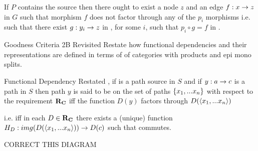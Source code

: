 \documentclass[xcolor=pst,dvips]{beamer}
\begin{document}
\begin{frame}
\IfSforproductepimonoCwithRCwords

 If $P$ contains the source  
then there ought to exist a node $z$ and an edge $f: x \rightarrow z$ in $G$ such that morphism $f$ does not factor through any of the $p_i$ morphisms 
i.e. such that there exist $g: y_i \rightarrow z$ in \catcw, for some $i$, such that $p_i\circ g = f$ in \catc. 
\end{frame}

\begin{frame}{Goodness Criteria 2B Revisited}
Restate how functional dependencies and their representations are defined in terms of  of categories with products and epi mono splits.
\end{frame}

\begin{frame}{Functional Dependency Restated}
\IfSforproductepimonoCwithRCwords, 
if  is a path source in $S$ and if
$y: a \rightarrow c$ is a path in $S$
then path $y$ is said to be  on the set of paths $\left\{x_1,...x_n\right\}$ with respect to the requirement $\textbf{R}_{\textbf{C}}$
iff the function $D(y)$ factors through $D(\langle x_1,... x_n \rangle)$

i.e. iff in each $D \in \textbf{R}_{\textbf{C}}$ there exists a  (unique)
function $H_D: img(D(\langle x_1,... x_n \rangle)) \rightarrow D(c)$ 
such that 
 commutes.
\end{frame}
\begin{frame} 
CORRECT THIS DIAGRAM
\end{frame}
\end{document}
